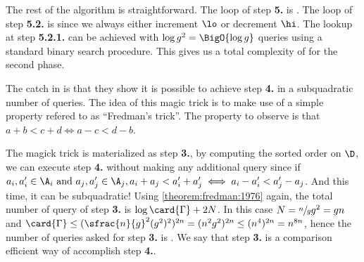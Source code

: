 The rest of the algorithm is straightforward. The loop of step \textbf{5.} is
. The loop of step \textbf{5.2.} is  since we
always either increment $\lo$ or decrement $\hi$. The lookup at step
\textbf{5.2.1.} can be achieved with $\log g^2 = \BigO{\log g}$ queries using
a standard binary search procedure. This gives us a total complexity of
 for the second phase.

The catch in \cite{gronlund:2014} is that they show it is possible to
achieve step \textbf{4.} in a subquadratic number of queries. The idea of this
magic trick is to make use of a simple property refered to as ``Fredman's
trick''. The property to observe is that $a + b < c + d \iff a - c < d - b$.

The magick trick is materialized as step \textbf{3.}, by computing the sorted
order on $\D$, we can execute step \textbf{4.} without making any additional
query since if $a_i, a_i' \in \A_i \text{ and } a_j, a_j' \in \A_j, a_i + a_j < a_i' +
a_j' \iff a_i - a_i' < a_j' - a_j$. And this time, it can be subquadratic!
Using \ref{theorem:fredman:1976} again, the total number of query of step
\textbf{3.} is $\log \card{\Gamma} + 2N$. In this case $N = \sfrac{n}{g}g^2 =
gn$ and $\card{\Gamma} \le (\sfrac{n}{g}^2 (g^2)^2)^{2n} = (n^2 g^2)^{2n} \le
(n^4)^{2n} = n^{8n}$, hence the number of queries asked for step \textbf{3.}
is . We say that step \textbf{3.} is a comparison
efficient way of accomplish step \textbf{4.}.
